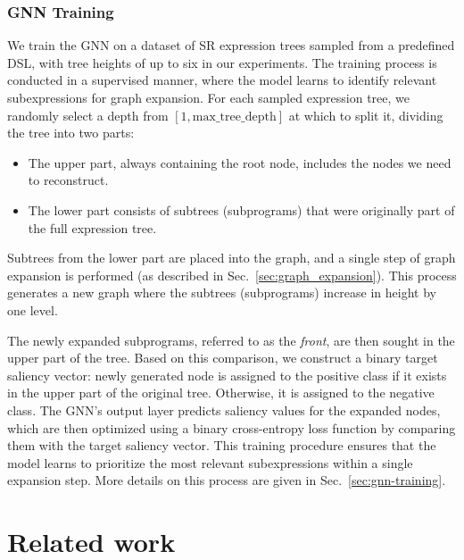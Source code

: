 \subsubsection{GNN Training}\label{sec:training}
We train the GNN on a dataset of SR expression trees sampled from a predefined DSL, with tree heights of up to six in our experiments. The training process is conducted in a supervised manner, where the model learns to identify relevant subexpressions for graph expansion.
For each sampled expression tree, we randomly select a depth from $[1, \mathrm{max\_tree\_depth}]$ at which to split it, dividing the tree into two parts:
\begin{itemize}
    \item The upper part, always containing the root node,  includes the nodes we need to reconstruct. %
    \item The lower part consists of subtrees (subprograms) that were originally part of the full expression tree.
\end{itemize}
Subtrees from the lower part are placed into the graph, and a single step of graph expansion is performed (as described in Sec.\ \ref{sec:graph_expansion}). This process generates a new graph where the subtrees (subprograms) increase in height by one level. 

The newly expanded subprograms, referred to as the \textit{front}, are then sought in the upper part of the tree. Based on this comparison, we construct a binary target saliency vector: newly generated node is assigned to the positive class if it exists in the upper part of the original tree. Otherwise, it is assigned to the negative class.
The GNN's output layer predicts saliency values for the expanded nodes, which are then optimized using a binary cross-entropy loss function by comparing them with the target saliency vector. This training procedure ensures that the model learns to prioritize the most relevant subexpressions within a single expansion step.
More details on this process are given in Sec.\ \ref{sec:gnn-training}. 




\section{Related work}\label{sec:related}

